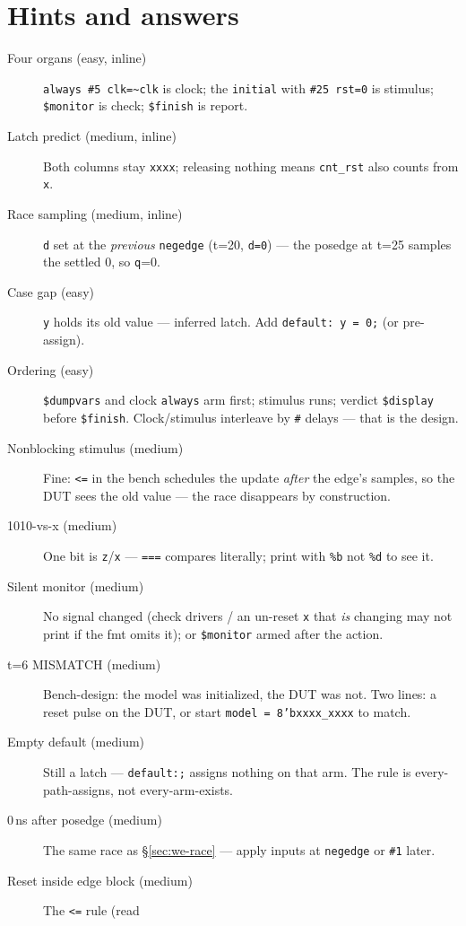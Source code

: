 \section*{Hints and answers}
\begin{description}
\item[Four organs (easy, inline)] \texttt{always \#5 clk=\textasciitilde clk}
is clock; the \texttt{initial} with \texttt{\#25 rst=0} is stimulus;
\texttt{\$monitor} is check; \texttt{\$finish} is report.
\item[Latch predict (medium, inline)] Both columns stay
\texttt{xxxx}; releasing nothing means \texttt{cnt\_rst} also counts
from \texttt{x}.
\item[Race sampling (medium, inline)] \texttt{d} set at the
\emph{previous} \texttt{negedge} (t=20, \texttt{d=0}) --- the posedge
at t=25 samples the settled 0, so \texttt{q}=0.
\item[Case gap (easy)] \texttt{y} holds its old value --- inferred
latch. Add \texttt{default: y = 0;} (or pre-assign).
\item[Ordering (easy)] \texttt{\$dumpvars} and clock
\texttt{always} arm first; stimulus runs; verdict
\texttt{\$display} before \texttt{\$finish}. Clock/stimulus
interleave by \texttt{\#} delays --- that is the design.
\item[Nonblocking stimulus (medium)] Fine: \texttt{<=} in the bench
schedules the update \emph{after} the edge's samples, so the DUT sees
the old value --- the race disappears by construction.
\item[1010-vs-x (medium)] One bit is \texttt{z}/\texttt{x} ---
\texttt{===} compares literally; print with \texttt{\%b} not
\texttt{\%d} to see it.
\item[Silent monitor (medium)] No signal changed (check drivers /
an un-reset \texttt{x} that \emph{is} changing may not print if the
fmt omits it); or \texttt{\$monitor} armed after the action.
\item[t=6 MISMATCH (medium)] Bench-design: the model was initialized,
the DUT was not. Two lines: a reset pulse on the DUT, or start
\texttt{model = 8'bxxxx\_xxxx} to match.
\item[Empty default (medium)] Still a latch --- \texttt{default:;}
assigns nothing on that arm. The rule is every-path-assigns, not
every-arm-exists.
\item[0\,ns after posedge (medium)] The same race as
\S\ref{sec:we-race} --- apply inputs at \texttt{negedge} or
\texttt{\#1} later.
\item[Reset inside edge block (medium)] The \texttt{<=} rule (read

\end{description}
